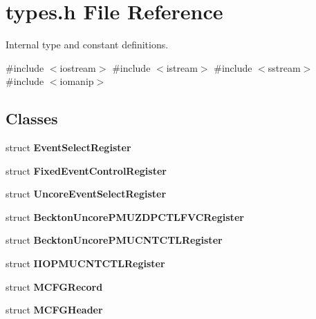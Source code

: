 \section{types.\+h File Reference}
\label{types_8h}


Internal type and constant definitions.  


{\ttfamily \#include $<$iostream$>$}\newline
{\ttfamily \#include $<$istream$>$}\newline
{\ttfamily \#include $<$sstream$>$}\newline
{\ttfamily \#include $<$iomanip$>$}\newline
\subsection*{Classes}
\begin{DoxyCompactItemize}
\item 
struct \textbf{ Event\+Select\+Register}
\item 
struct \textbf{ Fixed\+Event\+Control\+Register}
\item 
struct \textbf{ Uncore\+Event\+Select\+Register}
\item 
struct \textbf{ Beckton\+Uncore\+P\+M\+U\+Z\+D\+P\+C\+T\+L\+F\+V\+C\+Register}
\item 
struct \textbf{ Beckton\+Uncore\+P\+M\+U\+C\+N\+T\+C\+T\+L\+Register}
\item 
struct \textbf{ I\+I\+O\+P\+M\+U\+C\+N\+T\+C\+T\+L\+Register}
\item 
struct \textbf{ M\+C\+F\+G\+Record}
\item 
struct \textbf{ M\+C\+F\+G\+Header}
\end{DoxyCompactItemize}
